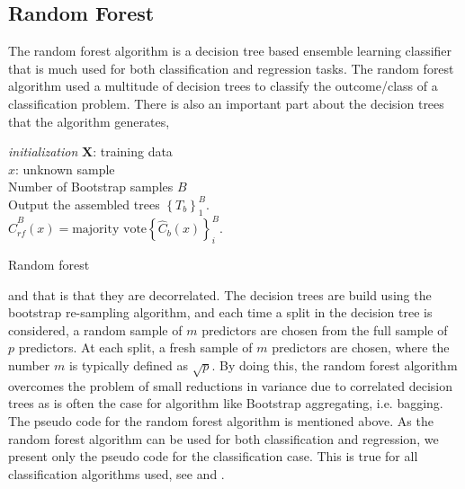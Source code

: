 \documentclass[../thesis.tex]{subfiles}
\begin{document}
\subsection{Random Forest}
\label{subsec:random_forr}

\noindent The random forest algorithm \citep{ho1995random} is a decision tree based ensemble learning classifier that is much used for both classification and regression tasks. The random forest algorithm used a multitude of decision trees to classify the outcome/class of a classification problem. There is also an important part about the decision trees that the algorithm generates,
\begin{algorithm}[H]{
\SetAlgoLined
\textit{initialization}\;
    \hspace{0.5cm} $\mathbf{X}$: training data\\
    \hspace{0.5cm} $x$: unknown sample\\
    \hspace{0.5cm} Number of Bootstrap samples $B$\\
    Output the assembled trees $\left\{T_b \right\}^B_1$.\\ 
    \Return $\hat{C}^B_{rf}(x) = \text{majority vote}\left\{\hat{C}_b(x)\right\}^B_i$.
}
\caption{Random forest}
\end{algorithm}
\noindent and that is that they are decorrelated. The decision trees are build using the bootstrap re-sampling algorithm, and each time a split in the decision tree is considered, a random sample of $m$ predictors are chosen from the full sample of \\
\indent $p$ predictors. At each split, a fresh sample of $m$ predictors are chosen, where the number $m$ is typically defined as $\sqrt{p}$. By doing this, the random forest algorithm overcomes the problem of small reductions in variance due to correlated decision trees as is often the case for algorithm like Bootstrap aggregating, i.e. bagging. The pseudo code for the random forest algorithm is mentioned above. As the random forest algorithm can be used for both classification and regression, we present only the pseudo code for the classification case. This is true for all classification algorithms used, see \citep{friedman2009elements} and \citep{james2013introduction}.\\
\end{document}

